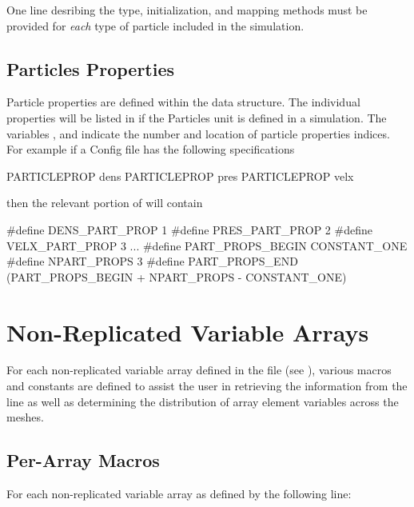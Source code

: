 One line desribing the type, initialization, and mapping methods must be
provided for {\em each} type of particle included in the simulation.

\subsection {Particles Properties}
\label{Sec:FlashHpartprops}
Particle properties are defined within the  data structure.
The individual properties will be listed in  if the
\unit{Particles} unit is defined in a simulation.  The variables 
,  and 
indicate the number and location of particle properties indices.
For example if a Config file has the following specifications
\begin{codeseg}

PARTICLEPROP dens
PARTICLEPROP pres
PARTICLEPROP velx

\end{codeseg}

then the relevant portion of  will contain
\begin{codeseg}
#define DENS_PART_PROP 1
#define PRES_PART_PROP 2
#define VELX_PART_PROP 3
...
#define PART_PROPS_BEGIN CONSTANT_ONE
#define NPART_PROPS 3
#define PART_PROPS_END (PART_PROPS_BEGIN + NPART_PROPS - CONSTANT_ONE)
\end{codeseg}

\section{Non-Replicated Variable Arrays}
\label{Sec:FlashHnonrep}
For each non-replicated variable array defined in the  file
(see ), various macros and constants are defined
to assist the user in retrieving the information from the  line as
well as determining the distribution of array element variables across the meshes.

\subsection{Per-Array Macros}
For each non-replicated variable array  as defined by the following
 line:


